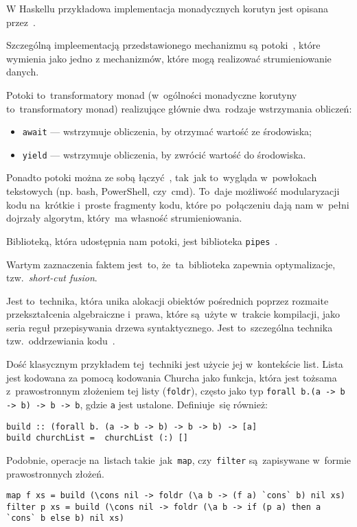 \documentclass[../../praca.tex]{subfiles}
\begin{document}
W Haskellu przykładowa implementacja monadycznych korutyn jest opisana 
przez~\cite{Blazevic:CP}.

Szczególną impleementacją przedstawionego mechanizmu są potoki~\cite{Blazevic:CP},
które~\cite{Thomasson:HHPP} wymienia jako jedno z mechanizmów, które mogą realizować
strumieniowanie danych.

Potoki to~transformatory monad (w~ogólności monadyczne korutyny to~transformatory monad)
realizujące głównie dwa~rodzaje wstrzymania obliczeń:
\begin{itemize}
  \item \texttt{await} --- wstrzymuje obliczenia, by otrzymać wartość ze środowiska;
  \item \texttt{yield} --- wstrzymuje obliczenia, by zwrócić wartość do środowiska.
\end{itemize}
Ponadto potoki można ze sobą łączyć~\cite{Blazevic:CP}, tak~jak to~wygląda 
w~powłokach tekstowych (np. bash, PowerShell, czy~cmd). To~daje możliwość
modularyzacji kodu na~krótkie i~proste fragmenty kodu, które po~połączeniu dają
nam w~pełni dojrzały algorytm, który~ma własność strumieniowania.

Biblioteką, która udostępnia nam potoki, jest biblioteka \texttt{pipes}~\cite{Hackage:Pipes}.

Wartym zaznaczenia faktem jest~to, że~ta~biblioteka zapewnia optymalizacje,
tzw.~\emph{short-cut fusion}. 

Jest to~technika, która unika alokacji obiektów pośrednich poprzez rozmaite
przekształcenia algebraiczne i~prawa, które są~użyte w~trakcie kompilacji,
jako seria reguł przepisywania drzewa syntaktycznego. Jest to~szczególna
technika tzw.~oddrzewiania kodu~\cite{Gill:SCD}.

Dość klasycznym przykładem tej~techniki jest użycie jej w~kontekście list.
Lista jest kodowana za pomocą kodowania Churcha jako funkcja, która jest
tożsama z~prawostronnym złożeniem tej listy (\texttt{foldr}), często jako typ
\texttt{forall b.(a -> b -> b) -> b -> b}, gdzie \texttt{a}
jest ustalone.
Definiuje~się również:
\begin{verbatim}
build :: (forall b. (a -> b -> b) -> b -> b) -> [a]
build churchList =  churchList (:) []
\end{verbatim}

Podobnie, operacje na~listach takie~jak~\texttt{map}, czy~\texttt{filter} 
są~zapisywane w~formie prawostronnych złożeń.

\begin{verbatim}
map f xs = build (\cons nil -> foldr (\a b -> (f a) `cons` b) nil xs)
filter p xs = build (\cons nil -> foldr (\a b -> if (p a) then a `cons` b else b) nil xs)
\end{verbatim}
\end{document}
